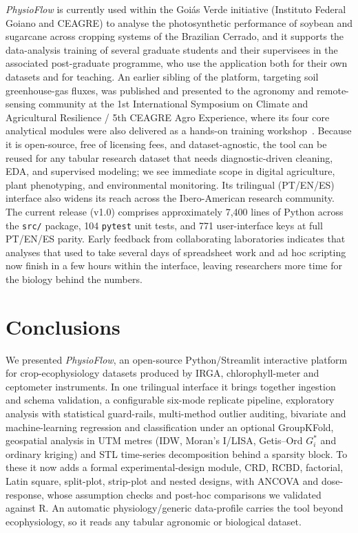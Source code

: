 \documentclass[preprint,12pt,a4paper]{elsarticle}
\begin{document}
\emph{PhysioFlow} is currently used within the Goi\'as Verde initiative (Instituto Federal Goiano and CEAGRE) to analyse the photosynthetic performance of soybean and sugarcane across cropping systems of the Brazilian Cerrado, and it supports the data-analysis training of several graduate students and their supervisees in the associated post-graduate programme, who use the application both for their own datasets and for teaching. An earlier sibling of the platform, targeting soil greenhouse-gas fluxes, was published and presented to the agronomy and remote-sensing community at the 1st International Symposium on Climate and Agricultural Resilience / 5th CEAGRE Agro Experience, where its four core analytical modules were also delivered as a hands-on training workshop~\cite{DaSilva2026Goias}. Because it is open-source, free of licensing fees, and dataset-agnostic, the tool can be reused for any tabular research dataset that needs diagnostic-driven cleaning, EDA, and supervised modeling; we see immediate scope in digital agriculture, plant phenotyping, and environmental monitoring. Its trilingual (PT/EN/ES) interface also widens its reach across the Ibero-American research community. The current release (v1.0) comprises approximately 7{,}400 lines of Python across the \texttt{src/} package, 104 \texttt{pytest} unit tests, and 771 user-interface keys at full PT/EN/ES parity. Early feedback from collaborating laboratories indicates that analyses that used to take several days of spreadsheet work and ad hoc scripting now finish in a few hours within the interface, leaving researchers more time for the biology behind the numbers.

\section{Conclusions}\label{sec:conclusions}

We presented \emph{PhysioFlow}, an open-source Python/Streamlit interactive platform for crop-ecophysiology datasets produced by IRGA, chlorophyll-meter and ceptometer instruments. In one trilingual interface it brings together ingestion and schema validation, a configurable six-mode replicate pipeline, exploratory analysis with statistical guard-rails, multi-method outlier auditing, bivariate and machine-learning regression and classification under an optional GroupKFold, geospatial analysis in UTM metres (IDW, Moran's I/LISA, Getis--Ord $G_i^*$ and ordinary kriging) and STL time-series decomposition behind a sparsity block. To these it now adds a formal experimental-design module, CRD, RCBD, factorial, Latin square, split-plot, strip-plot and nested designs, with ANCOVA and dose-response, whose assumption checks and post-hoc comparisons we validated against R. An automatic physiology/generic data-profile carries the tool beyond ecophysiology, so it reads any tabular agronomic or biological dataset.
\end{document}
